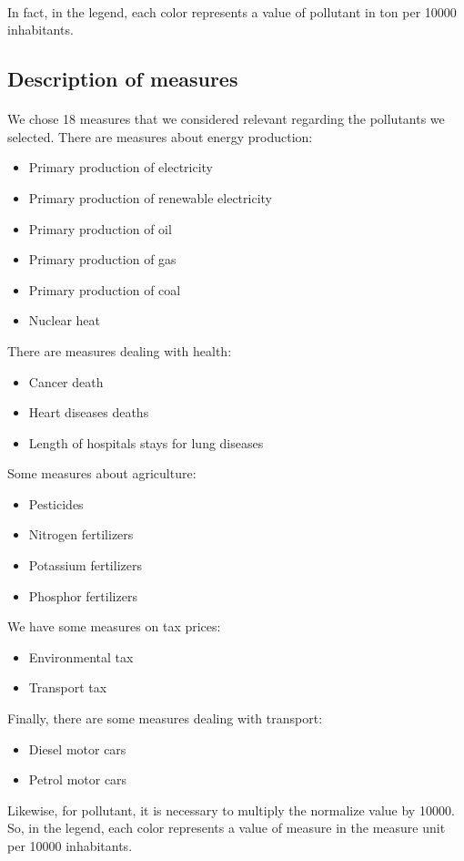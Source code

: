 \documentclass[preprint,journal]{vgtc}       %
\begin{document}
\paragraph{}
In fact, in the legend, each color represents a value of pollutant in ton per 10000 inhabitants.

\subsection{Description of measures }

\paragraph{}
We chose 18 measures that we considered relevant regarding the pollutants we selected.
\newline
There are measures about energy production:
	\begin{itemize}[parsep=0cm,itemsep=0cm]
	\item Primary production of electricity
	\item Primary production of renewable electricity
	\item Primary production of oil
	\item Primary production of gas
	\item Primary production of coal
	\item Nuclear heat
	\end{itemize}
There are measures dealing with health:
	\begin{itemize}[parsep=0cm,itemsep=0cm]
	\item Cancer death
	\item Heart diseases deaths
	\item Length of hospitals stays for lung diseases
	\end{itemize}	
Some measures about agriculture:
	\begin{itemize}[parsep=0cm,itemsep=0cm]
	\item Pesticides
	\item Nitrogen fertilizers
	\item Potassium fertilizers
	\item Phosphor fertilizers
	\end{itemize}	
We have some measures on tax prices:
	\begin{itemize}[parsep=0cm,itemsep=0cm]
	\item Environmental tax
	\item Transport tax
	\end{itemize}	
Finally, there are some measures dealing with transport:
	\begin{itemize}[parsep=0cm,itemsep=0cm]
	\item Diesel motor cars
	\item Petrol motor cars
	\end{itemize}
Likewise, for pollutant, it is necessary to multiply the normalize value by 10000. So, in the legend, each color represents a value of measure in the measure unit per 10000 inhabitants.
\end{document}
